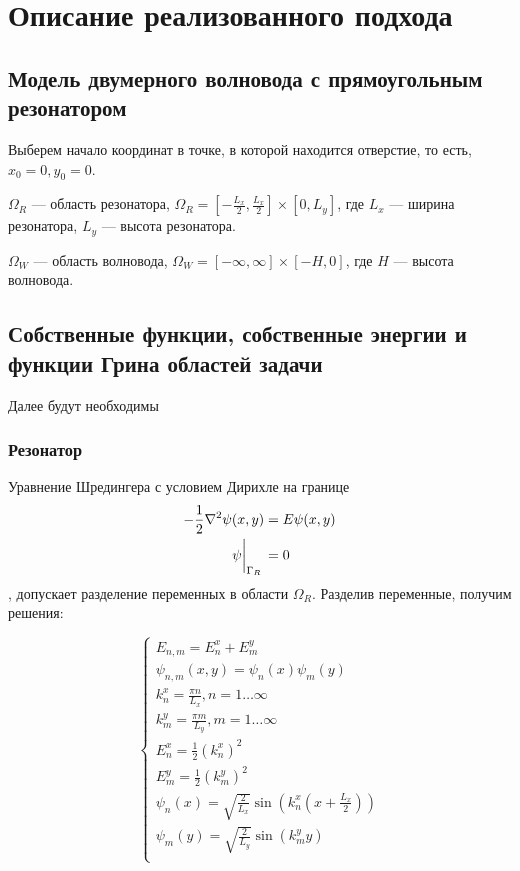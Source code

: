 \chapter{Описание реализованного подхода}
\label{chapter2}

\section{Модель двумерного волновода с прямоугольным резонатором}


Выберем начало координат в точке, в которой находится отверстие, то есть, $x_0 = 0, y_0 = 0$.

$\Omega_R$ — область резонатора, $\Omega_R = [- \frac{L_x}{2}, \frac{L_x}{2}] \times [0, L_y]$, где $L_x$ — ширина резонатора, $L_y$ — высота резонатора.

$\Omega_W$ — область волновода, $\Omega_W = [-\infty, \infty] \times [-H, 0]$, где $H$ — высота волновода.


\section{Собственные функции, собственные энергии и функции Грина областей задачи}
Далее будут необходимы 
\subsection{Резонатор}
Уравнение Шредингера с условием Дирихле на границе
\begin{align*}
- \frac{1}{2}\laplacian \psi(x, y) &= E \psi(x, y) \\
\eval{\psi}_{\Gamma_R}{} &= 0
\end{align*}
, допускает разделение переменных в области $\Omega_R$. Разделив переменные, получим решения:

\[
\begin{cases}
E_{n,m} = E_n^x + E_m^y \\
\psi_{n, m}(x, y) = \psi_n(x) \psi_m(y) \\
k_n^x = \frac{\pi n}{L_x}, n = 1 \dots \infty \\
k_m^y = \frac{\pi m}{L_y}, m = 1 \dots \infty \\
E_n^x = \frac{1}{2} (k_n^x)^2 \\
E_m^y = \frac{1}{2} (k_m^y)^2 \\
\psi_n(x) = \sqrt{\frac{2}{L_x}} \sin(k_n^x (x + \frac{L_x}{2}))\\
\psi_m(y) = \sqrt{\frac{2}{L_y}} \sin(k_m^y y) \\
\end{cases}
\]

